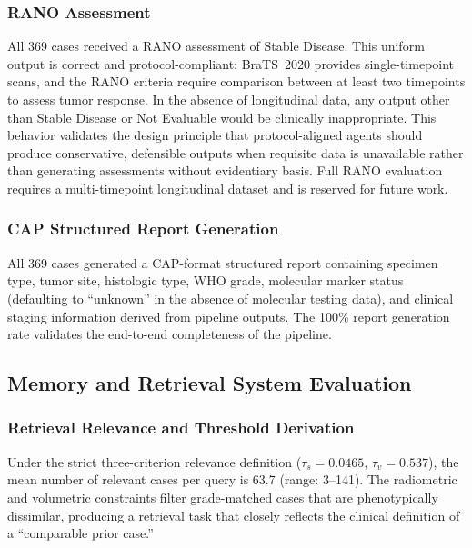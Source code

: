 \documentclass[journal]{IEEEtran}
\begin{document}
\subsubsection{RANO Assessment}

All 369 cases received a RANO assessment of Stable Disease. This uniform
output is correct and protocol-compliant: BraTS~2020 provides
single-timepoint scans, and the RANO criteria require comparison between
at least two timepoints to assess tumor response. In the absence of
longitudinal data, any output other than Stable Disease or Not Evaluable
would be clinically inappropriate. This behavior validates the design
principle that protocol-aligned agents should produce conservative,
defensible outputs when requisite data is unavailable rather than
generating assessments without evidentiary basis. Full RANO evaluation
requires a multi-timepoint longitudinal dataset and is reserved for
future work.

\subsubsection{CAP Structured Report Generation}

All 369 cases generated a CAP-format structured report containing specimen
type, tumor site, histologic type, WHO grade, molecular marker status
(defaulting to ``unknown'' in the absence of molecular testing data), and
clinical staging information derived from pipeline outputs. The 100\%
report generation rate validates the end-to-end completeness of the
pipeline.

\subsection{Memory and Retrieval System Evaluation}

\subsubsection{Retrieval Relevance and Threshold Derivation}

Under the strict three-criterion relevance definition
($\tau_s = 0.0465$, $\tau_v = 0.537$), the mean number of relevant cases
per query is 63.7 (range: 3--141). The radiometric and volumetric
constraints filter grade-matched cases that are phenotypically dissimilar,
producing a retrieval task that closely reflects the clinical definition
of a ``comparable prior case.''
\end{document}
